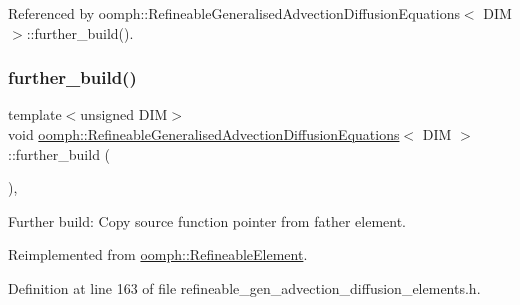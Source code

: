 Referenced by oomph\+::\+Refineable\+Generalised\+Advection\+Diffusion\+Equations$<$ D\+I\+M $>$\+::further\+\_\+build().

\mbox{\label{classoomph_1_1RefineableGeneralisedAdvectionDiffusionEquations_a03a7314c44b1f5a8f89bc16f8b62b5dc}} 
\subsubsection{\texorpdfstring{further\+\_\+build()}{further\_build()}}
{\footnotesize\ttfamily template$<$unsigned D\+IM$>$ \\
void \hyperlink{classoomph_1_1RefineableGeneralisedAdvectionDiffusionEquations}{oomph\+::\+Refineable\+Generalised\+Advection\+Diffusion\+Equations}$<$ D\+IM $>$\+::further\+\_\+build (\begin{DoxyParamCaption}{ }\end{DoxyParamCaption})\hspace{0.3cm}{\ttfamily [inline]}, {\ttfamily [virtual]}}



Further build\+: Copy source function pointer from father element. 



Reimplemented from \hyperlink{classoomph_1_1RefineableElement_a26628ce36dfad028686adeb4694a9ef3}{oomph\+::\+Refineable\+Element}.



Definition at line 163 of file refineable\+\_\+gen\+\_\+advection\+\_\+diffusion\+\_\+elements.\+h.



